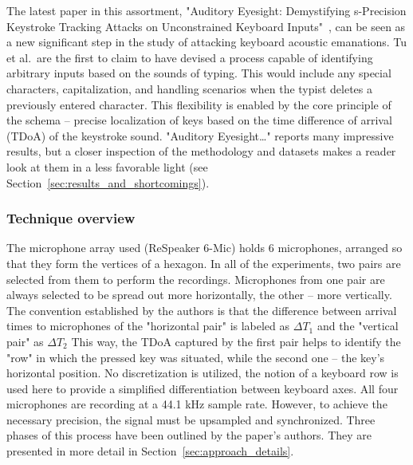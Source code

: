 \documentclass[../main.tex]{subfiles}
\begin{document}
The latest paper in this assortment, "Auditory Eyesight: Demystifying 
\textmu s-Precision Keystroke Tracking Attacks on Unconstrained Keyboard Inputs"~\cite{unconstrained2023},
can be seen as a new significant step in the study of attacking keyboard acoustic emanations.
Tu et al.\ are the first to claim to have devised a process capable of identifying
arbitrary inputs based on the sounds of typing. This would include any
special characters, capitalization, and handling scenarios when the typist
deletes a previously entered character. This flexibility is enabled by the
core principle of the schema -- precise localization of keys based on the
time difference of arrival (TDoA) of the keystroke sound. 
"Auditory Eyesight\ldots{}" reports many impressive results, but a closer inspection
of the methodology and datasets makes a reader look at them in a less favorable light
(see Section~\ref{sec:results_and_shortcomings}).

\subsubsection{Technique overview}
The microphone array used (ReSpeaker 6-Mic) holds 6 microphones, arranged 
so that they form the vertices of a hexagon. In all of the experiments, two pairs
are selected from them to perform the recordings. Microphones from one pair are always 
selected to be spread out more horizontally, the other -- more vertically.
The convention established by the authors is that the difference between arrival times
to microphones of the "horizontal pair" is labeled as $\Delta T_1$ and the "vertical pair"
as $\Delta T_2$
This way, the TDoA captured by the first pair helps to identify the "row" in which
the pressed key was situated, while the second one -- the key's horizontal position.
No discretization is utilized, the notion of a keyboard row is used here to
provide a simplified differentiation between keyboard axes.
All four microphones are recording at a 44.1 kHz sample rate.
However, to achieve the necessary precision, the signal must be upsampled
and synchronized. Three phases of this process have been outlined by the paper's authors.
They are presented in more detail in Section~\ref{sec:approach_details}.
\end{document}
